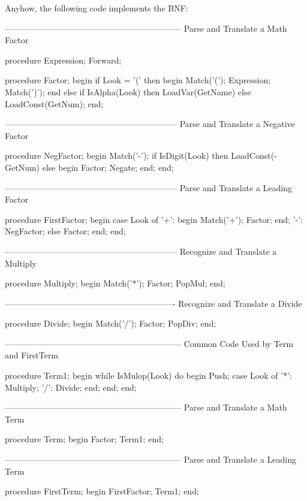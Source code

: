 \documentclass[float=false, crop=false]{standalone}
\begin{document}
Anyhow, the following code implements the BNF:

\begin{code}
{---------------------------------------------------------------}
{ Parse and Translate a Math Factor }

procedure Expression; Forward;

procedure Factor;
begin
   if Look = '(' then begin
      Match('(');
      Expression;
      Match(')');
      end
   else if IsAlpha(Look) then
      LoadVar(GetName)
   else
      LoadConst(GetNum);
end;


{--------------------------------------------------------------}
{ Parse and Translate a Negative Factor }

procedure NegFactor;
begin
   Match('-');
   if IsDigit(Look) then
      LoadConst(-GetNum)
   else begin
      Factor;
      Negate;
   end;
end;


{--------------------------------------------------------------}
{ Parse and Translate a Leading Factor }

procedure FirstFactor;
begin
   case Look of
     '+': begin
             Match('+');
             Factor;
          end;
     '-': NegFactor;
   else  Factor;
   end;
end;


{--------------------------------------------------------------}
{ Recognize and Translate a Multiply }

procedure Multiply;
begin
   Match('*');
   Factor;
   PopMul;
end;


{-------------------------------------------------------------}
{ Recognize and Translate a Divide }

procedure Divide;
begin
   Match('/');
   Factor;
   PopDiv;
end;


{---------------------------------------------------------------}
{ Common Code Used by Term and FirstTerm }

procedure Term1;
begin
   while IsMulop(Look) do begin
      Push;
      case Look of
       '*': Multiply;
       '/': Divide;
      end;
   end;
end;


{---------------------------------------------------------------}
{ Parse and Translate a Math Term }

procedure Term;
begin
   Factor;
   Term1;
end;


{---------------------------------------------------------------}
{ Parse and Translate a Leading Term }

procedure FirstTerm;
begin
   FirstFactor;
   Term1;
end;



\end{code}
\end{document}
